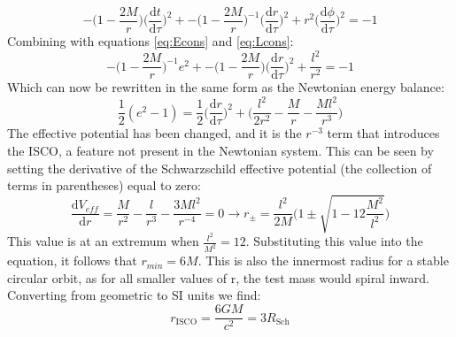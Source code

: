 \documentclass[11pt]{article}
\begin{document}
\begin{framed}
$$
-\Big(1-\frac{2M}{r}\Big)\Big(\frac{\mathrm{d}t}{\mathrm{d}\tau}\Big)^2 + -\Big(1-\frac{2M}{r}\Big)^{-1}\Big(\frac{\mathrm{d}r}{\mathrm{d}\tau}\Big)^2 + r^2\Big(\frac{\mathrm{d}\phi}{\mathrm{d}\tau}\Big)^2 = -1
$$
Combining with equations \ref{eq:Econs} and \ref{eq:Lcons}:
$$
-\Big(1-\frac{2M}{r}\Big)^{-1}e^2 + -\Big(1-\frac{2M}{r}\Big)\Big(\frac{\mathrm{d}r}{\mathrm{d}\tau}\Big)^2 + \frac{l^2}{r^2} = -1
$$
Which can now be rewritten in the same form as the Newtonian energy balance:
\begin{equation}
	\frac{1}{2}(e^2-1) = \frac{1}{2}\Big(\frac{\mathrm{d}r}{\mathrm{d}\tau}\Big)^2 + \Bigg(\frac{l^2}{2r^2}-\frac{M}{r}-\frac{Ml^2}{r^3}\Bigg)
\end{equation}
The effective potential has been changed, and it is the $r^{-3}$ term that introduces the ISCO, a feature not present in the Newtonian system. This can be seen by setting the derivative of the Schwarzschild effective potential (the collection of terms in parentheses) equal to zero:
$$
\frac{\mathrm{d}V_{eff}}{\mathrm{d}r} = \frac{M}{r^2} - \frac{l}{r^3} - \frac{3Ml^2}{r^{-4}} = 0 \rightarrow r_{\pm} = \frac{l^2}{2M}\Big(1\pm\sqrt{1-12\frac{M^2}{l^2}}\Big)
$$
This value is at an extremum when $\frac{l^2}{M^2} = 12$. Substituting this value into the equation, it follows that $r_{min} = 6M$. This is also the innermost radius for a stable circular orbit, as for all smaller values of r, the test mass would spiral inward. Converting from geometric to SI units we find:
\begin{equation}
	r_{\mathrm{ISCO}} = \frac{6GM}{c^2} = 3R_{\mathrm{Sch}}
\end{equation}
\end{framed}
\end{document}
